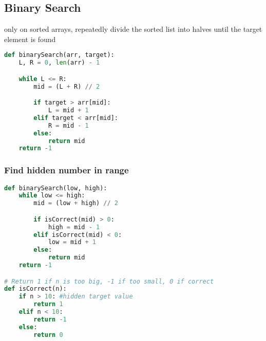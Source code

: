 \documentclass[english, threecolumn]{latex4ei/latex4ei_sheet}
\begin{document}
\begin{sectionbox}
\subsection{Binary Search}
only on sorted arrays, repeatedly divide the sorted list into halves until the target element is found
\begin{lstlisting}[language=python, gobble=0]
def binarySearch(arr, target):
    L, R = 0, len(arr) - 1

    while L <= R:
        mid = (L + R) // 2

        if target > arr[mid]:
            L = mid + 1
        elif target < arr[mid]:
            R = mid - 1
        else:
            return mid
    return -1
\end{lstlisting}

\subsubsection{Find hidden number in range}
\begin{lstlisting}[language=python, gobble=0]
def binarySearch(low, high):
    while low <= high:
        mid = (low + high) // 2

        if isCorrect(mid) > 0:
            high = mid - 1
        elif isCorrect(mid) < 0:
            low = mid + 1
        else:
            return mid
    return -1

# Return 1 if n is too big, -1 if too small, 0 if correct
def isCorrect(n):
    if n > 10: #hidden target value
        return 1
    elif n < 10:
        return -1
    else:
        return 0
\end{lstlisting}
\end{sectionbox}
\end{document}
